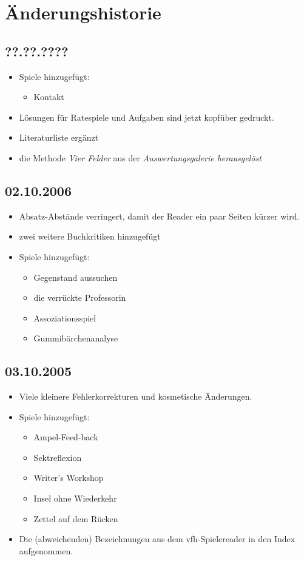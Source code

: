 \chapter{Änderungshistorie}
\section*{??.??.????}
\begin{itemize}
  \item Spiele hinzugefügt:
  \begin{itemize}
    \item Kontakt
  \end{itemize}
  \item Lösungen für Ratespiele und Aufgaben sind jetzt kopfüber gedruckt.
  \item Literaturliste ergänzt
  \item die Methode \emph{Vier Felder} aus der \emph{Auswertungsgalerie herausgelöst}
\end{itemize}


\section*{02.10.2006}
\begin{itemize}
  \item Absatz-Abstände verringert, damit der Reader ein paar Seiten kürzer wird.
  \item zwei weitere Buchkritiken hinzugefügt
  \item Spiele hinzugefügt:
  \begin{itemize}
    \item Gegenstand aussuchen
    \item die verrückte Professorin
    \item Assoziationsspiel
    \item Gummibärchenanalyse
  \end{itemize}
\end{itemize}



\section*{03.10.2005}
\begin{itemize}
  \item Viele kleinere Fehlerkorrekturen und kosmetische Änderungen.
  \item Spiele hinzugefügt:
  \begin{itemize}
    \item Ampel-Feed-back
    \item Sektreflexion
    \item Writer's Workshop
    \item Insel ohne Wiederkehr
    \item Zettel auf dem Rücken
  \end{itemize}
  \item Die (abweichenden) Bezeichnungen aus dem vfh-Spielereader in den Index aufgenommen.
\end{itemize}

